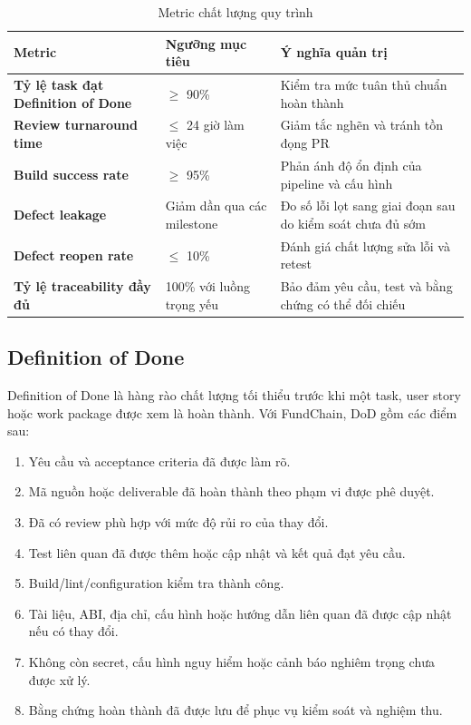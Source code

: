 \begin{table}[H]
\centering
\caption{Metric chất lượng quy trình}
\label{tab:process-quality-metrics}
\begin{tabularx}{\textwidth}{| >{\bfseries}p{4.2cm} | p{3cm} | X |}
\hline
Metric & Ngưỡng mục tiêu & Ý nghĩa quản trị \\
\hline
Tỷ lệ task đạt Definition of Done & $\geq$ 90\% & Kiểm tra mức tuân thủ chuẩn hoàn thành \\ \hline
Review turnaround time & $\leq$ 24 giờ làm việc & Giảm tắc nghẽn và tránh tồn đọng PR \\ \hline
Build success rate & $\geq$ 95\% & Phản ánh độ ổn định của pipeline và cấu hình \\ \hline
Defect leakage & Giảm dần qua các milestone & Đo số lỗi lọt sang giai đoạn sau do kiểm soát chưa đủ sớm \\ \hline
Defect reopen rate & $\leq$ 10\% & Đánh giá chất lượng sửa lỗi và retest \\ \hline
Tỷ lệ traceability đầy đủ & 100\% với luồng trọng yếu & Bảo đảm yêu cầu, test và bằng chứng có thể đối chiếu \\
\hline
\end{tabularx}
\end{table}

\subsection{Definition of Done}

Definition of Done là hàng rào chất lượng tối thiểu trước khi một task, user story hoặc work package được xem là hoàn thành. Với FundChain, DoD gồm các điểm sau:

\begin{enumerate}
  \item Yêu cầu và acceptance criteria đã được làm rõ.
  \item Mã nguồn hoặc deliverable đã hoàn thành theo phạm vi được phê duyệt.
  \item Đã có review phù hợp với mức độ rủi ro của thay đổi.
  \item Test liên quan đã được thêm hoặc cập nhật và kết quả đạt yêu cầu.
  \item Build/lint/configuration kiểm tra thành công.
  \item Tài liệu, ABI, địa chỉ, cấu hình hoặc hướng dẫn liên quan đã được cập nhật nếu có thay đổi.
  \item Không còn secret, cấu hình nguy hiểm hoặc cảnh báo nghiêm trọng chưa được xử lý.
  \item Bằng chứng hoàn thành đã được lưu để phục vụ kiểm soát và nghiệm thu.
\end{enumerate}

